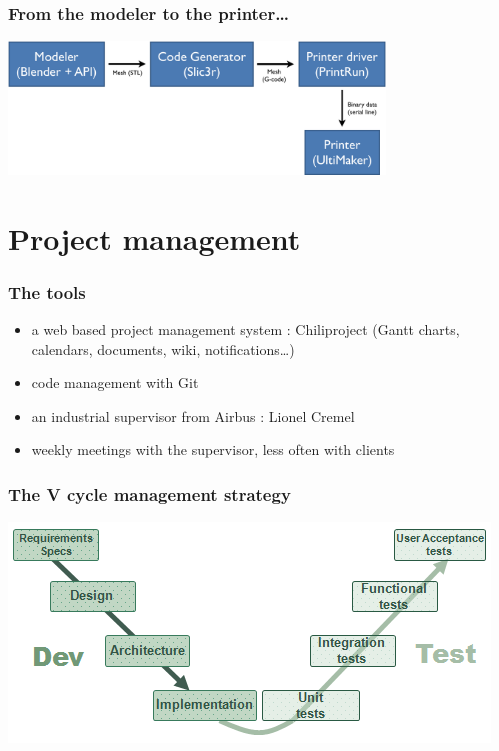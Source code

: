 \documentclass{beamer}
\begin{document}
\begin{frame}
	\frametitle{From the modeler to the printer…}

    \begin{center}
		\includegraphics[width=10cm]{schema}	
	\end{center}
	
\end{frame}

\section{Project management}

\begin{frame}
	\frametitle{The tools}
	\begin{block}{}
    \begin{itemize}
		\item a web based project management system : Chiliproject (Gantt charts, calendars, documents, wiki, notifications\ldots )
		\item code management with Git
		\item an industrial supervisor from Airbus : Lionel Cremel
		\item weekly meetings with the supervisor, less often with clients
	\end{itemize}
	\end{block}
\end{frame}

\begin{frame}
	\frametitle{The V cycle management strategy}
	\begin{center}
		\includegraphics[width=\textwidth]{VCycle}	
	\end{center}
    
\end{frame}
\end{document}
